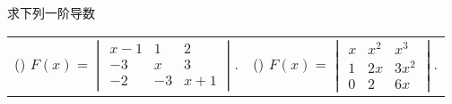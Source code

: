 
\begin{example}
    求下列一阶导数
    \setcounter{magicrownumbers}{0}
    \begin{table}[H]
        \centering
        \begin{tabular}{l | l}
            (\rownumber{}) $\displaystyle F(x)=\begin{vmatrix}x-1 & 1 &2 \\-3 & x &3 \\-2 & -3 &x+1\end{vmatrix}.$ & (\rownumber{}) $\displaystyle F(x)=\begin{vmatrix}x &x^2 &x^3 \\1 & 2x &3x^2 \\0 & 2 &6x\end{vmatrix}.$ \\
        \end{tabular}
    \end{table}
\end{example}
